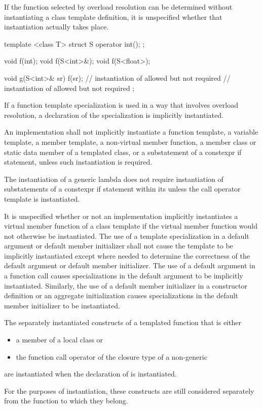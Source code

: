 \pnum
If the function selected by overload resolution
can be determined without instantiating a class template definition,
it is unspecified whether that instantiation actually takes place.
\begin{example}
\begin{codeblock}
template <class T> struct S {
  operator int();
};

void f(int);
void f(S<int>&);
void f(S<float>);

void g(S<int>& sr) {
  f(sr);            // instantiation of  allowed but not required
                    // instantiation of  allowed but not required
};
\end{codeblock}
\end{example}

\pnum
If a function template specialization is used in
a way that involves overload resolution,
a declaration of the specialization is implicitly instantiated.

\pnum
An implementation shall not implicitly instantiate a function template,
a variable template,
a member template, a non-virtual member function, a member class or
static data member of a templated class, or a substatement of a constexpr if
statement, unless such instantiation is required.
\begin{note}
The instantiation of a generic lambda
does not require instantiation of
substatements of a constexpr if statement
within its 
unless the call operator template is instantiated.
\end{note}
It is unspecified whether or not an implementation implicitly instantiates a
virtual member function of a class template if the virtual member function would
not otherwise be instantiated.
The use of a template specialization in
a default argument or default member initializer
shall not cause the template to be implicitly instantiated except
where needed to determine
the correctness of the default argument or default member initializer.
The use of a default argument in a
function call causes specializations in the default argument to be implicitly
instantiated.
Similarly, the use of a default member initializer
in a constructor definition or an aggregate initialization
causes specializations in the default member initializer to be instantiated.

\pnum
The separately instantiated constructs
of a templated function  that is either
\begin{itemize}
\item
a member of a local class or
\item
the function call operator of the closure type
of a non-generic 
\end{itemize}
are instantiated when the declaration of  is instantiated.
\begin{note}
For the purposes of instantiation,
these constructs are still considered separately
from the function to which they belong.
\end{note}

